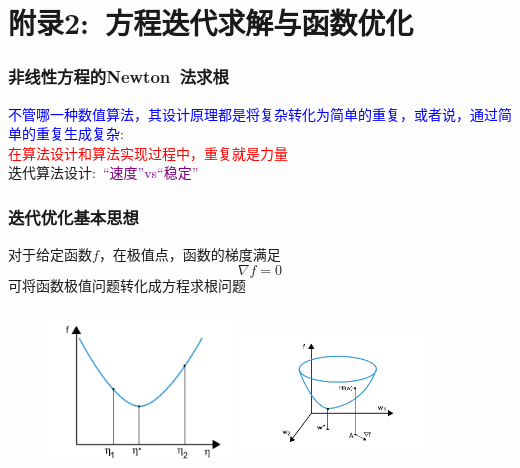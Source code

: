 \documentclass[cjk,slidestop,compress,mathserif,blue]{beamer}
\begin{document}
\section{附录2:~方程迭代求解与函数优化}
\frame
{
	\frametitle{非线性方程的\rm{Newton~}法求根}
	\textcolor{blue}{不管哪一种数值算法，其设计原理都是将复杂转化为简单的重复，或者说，通过简单的重复生成复杂}:\\
	\textcolor{red}{在算法设计和算法实现过程中，重复就是力量}\\
迭代算法设计:~\textcolor{purple}{“速度”\textrm{vs}“稳定”}
\begin{figure}[h!]
\centering
{}
\label{Equation_Newon}
\end{figure}
}

\frame
{
	\frametitle{迭代优化基本思想}
	对于给定函数$f$，在极值点，函数的梯度满足
	\begin{displaymath}
		\nabla f=0
	\end{displaymath}
	可将函数极值问题转化成方程求根问题
\begin{figure}[h!]
\centering
\includegraphics[height=1.68in,width=1.95in,viewport=30 0 450 360,clip]{Figures/OP_mini-1.png}
\hskip 0.05in
\includegraphics[height=1.68in,width=1.95in,viewport=150 20 560 390,clip]{Figures/OP_mini-2.png}
\label{OP_mini}
\end{figure}
}
\end{document}
